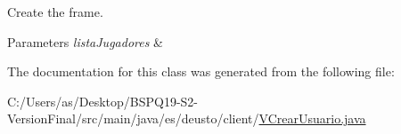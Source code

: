 Create the frame. 
\begin{DoxyParams}{Parameters}
{\em lista\+Jugadores} & \\
\hline
\end{DoxyParams}


The documentation for this class was generated from the following file\+:\begin{DoxyCompactItemize}
\item 
C\+:/\+Users/as/\+Desktop/\+B\+S\+P\+Q19-\/\+S2-\/\+Version\+Final/src/main/java/es/deusto/client/\mbox{\hyperlink{_v_crear_usuario_8java}{V\+Crear\+Usuario.\+java}}\end{DoxyCompactItemize}
